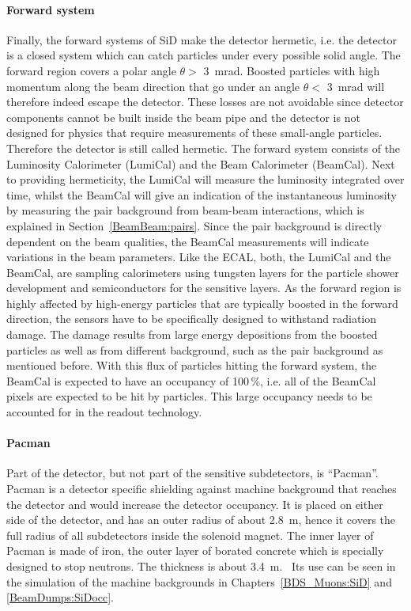 \paragraph{Forward system}
Finally, the forward systems of SiD make the detector hermetic, i.e. the detector is a closed system which can catch particles under every possible solid angle.
The forward region covers a polar angle $\theta > $ \SI{3}{\milli\radian}.
Boosted particles with high momentum along the beam direction that go under an angle $\theta < $ \SI{3}{\milli\radian} will therefore indeed escape the detector.
These losses are not avoidable since detector components cannot be built inside the beam pipe and the detector is not designed for physics that require measurements of these small-angle particles.
Therefore the detector is still called hermetic.
The forward system consists of the Luminosity Calorimeter (LumiCal) and the Beam Calorimeter (BeamCal).
Next to providing hermeticity, the LumiCal will measure the luminosity integrated over time, whilst the BeamCal will give an indication of the instantaneous luminosity by measuring the \positron \electron pair background from beam-beam interactions, which is explained in Section~\ref{BeamBeam:pairs}.
Since the pair background is directly dependent on the beam qualities, the BeamCal measurements will indicate variations in the beam parameters.
Like the ECAL, both, the LumiCal and the BeamCal, are sampling calorimeters using tungsten layers for the particle shower development and semiconductors for the sensitive layers.
As the forward region is highly affected by high-energy particles that are typically boosted in the forward direction, the sensors have to be specifically designed to withstand radiation damage.
The damage results from large energy depositions from the boosted particles as well as from different background, such as the pair background as mentioned before.
With this flux of particles hitting the forward system, the BeamCal is expected to have an occupancy of 100\,\%, i.e. all of the BeamCal pixels are expected to be hit by particles.
This large occupancy needs to be accounted for in the readout technology.~\cite[p. 133ff]{TDR4}
\paragraph{Pacman}
Part of the detector, but not part of the sensitive subdetectors, is ``Pacman''.
Pacman is a detector specific shielding against machine background that reaches the detector and would increase the detector occupancy.
It is placed on either side of the detector, and has an outer radius of about \SI{2.8}{\meter}, hence it covers the full radius of all subdetectors inside the solenoid magnet.
The inner layer of Pacman is made of iron, the outer layer of borated concrete which is specially designed to stop neutrons.
The thickness is about \SI{3.4}{\meter}.~\cite{SiD_Geo}
Its use can be seen in the simulation of the machine backgrounds in Chapters~\ref{BDS_Muons:SiD} and \ref{BeamDumps:SiDocc}.

